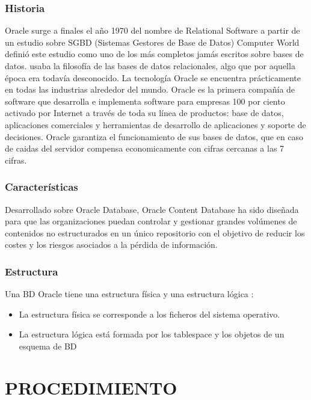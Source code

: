 \documentclass[preprint,12pt]{elsarticle}
\begin{document}
\subsubsection{\textbf{Historia}}
Oracle surge a finales el año 1970 del nombre de Relational Software a partir de un estudio sobre SGBD (Sistemas Gestores de Base de Datos) Computer World definió este estudio como uno de los más completos jamás escritos sobre bases de datos.
usaba la filosofía de las bases de datos relacionales, algo que por aquella época era todavía desconocido.
La tecnología Oracle se encuentra prácticamente en todas las industrias alrededor del mundo.
Oracle es la primera compañía de software que desarrolla e implementa software para empresas 100 por ciento activado por Internet a través de toda su línea de productos: base de datos, aplicaciones comerciales y herramientas de desarrollo de aplicaciones y soporte de decisiones.
Oracle garantiza el funcionamiento de sus bases de datos, que en caso de caidas del servidor compensa economicamente con cifras cercanas a las 7 cifras. 

\subsubsection{\textbf{Características}}
Desarrollado sobre Oracle Database, Oracle Content Database ha sido diseñada para que las organizaciones puedan controlar y gestionar grandes volúmenes de contenidos no estructurados en un único repositorio con el objetivo de reducir los costes y los riesgos asociados a la pérdida de información. 

\subsubsection{\textbf{Estructura}}
Una BD Oracle tiene una estructura física y una estructura lógica : 
\begin{itemize}
	\item La estructura física se corresponde a los ficheros del sistema operativo.
	\item La estructura lógica está formada por los tablespace y los objetos de un esquema de BD 
\end{itemize}


\section{PROCEDIMIENTO}
\end{document}
